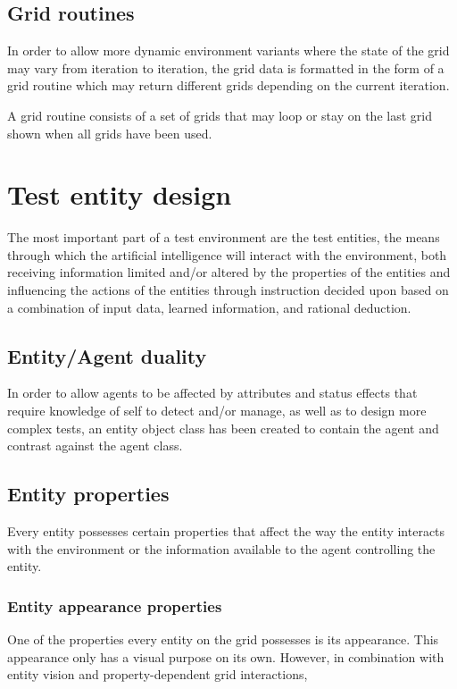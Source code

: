 \documentclass[masterthesis]{fer}
\begin{document}
\subsection{Grid routines}

In order to allow more dynamic environment variants where the state of the grid may vary from iteration to iteration, the grid data is formatted in the form of a grid routine which may return different grids depending on the current iteration.

A grid routine consists of a set of grids that may loop or stay on the last grid shown when all grids have been used. 

\section{Test entity design}

The most important part of a test environment are the test entities, the means through which the artificial intelligence will interact with the environment, both receiving information limited and/or altered by the properties of the entities and influencing the actions of the entities through instruction decided upon based on a combination of input data, learned information, and rational deduction.

\subsection{Entity/Agent duality}
In order to allow agents to be affected by attributes and status effects that require knowledge of self to detect and/or manage, as well as to design more complex tests, an entity object class has been created to contain the agent and contrast against the agent class.

\subsection{Entity properties}

Every entity possesses certain properties that affect the way the entity interacts with the environment or the information available to the agent controlling the entity.

\subsubsection{Entity appearance properties}

One of the properties every entity on the grid possesses is its appearance. This appearance only has a visual purpose on its own.
However, in combination with entity vision and property-dependent grid interactions, 
\end{document}
